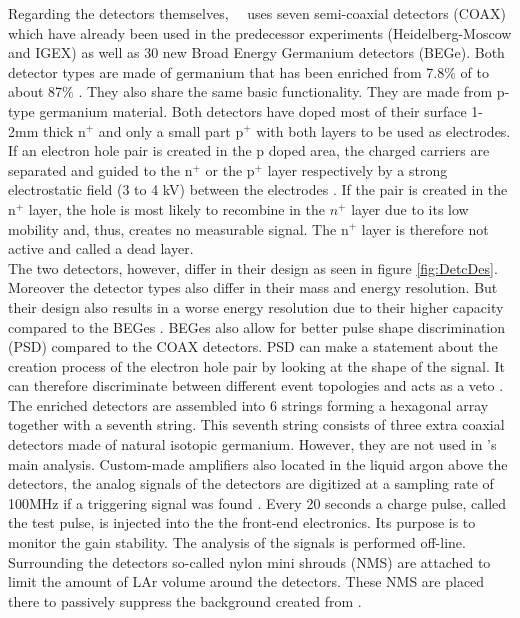 \documentclass[encoding=utf8,british]{tumphthesis}
\begin{document}
Regarding the detectors themselves, \gerda\ \PII\ uses seven semi-coaxial detectors (COAX) which have already been used in the predecessor experiments (Heidelberg-Moscow and IGEX) as well as 30 new Broad Energy Germanium detectors (BEGe).
Both detector types are made of germanium that has been enriched from 7.8$\%$ of  to about 87$\%$ \cite{agostini_background_2017}.
They also share the same basic functionality.
They are made from p-type germanium material.
Both detectors have doped most of their surface 1-2mm thick n$^+$ and only a small part p$^+$ with both layers to be used as electrodes.
If an electron hole pair is created in the p doped area, the charged carriers are separated and guided to the n$^+$ or the p$^+$ layer respectively by a strong electrostatic field (3 to 4 kV) between the electrodes \cite{spieler_semiconductor_2005}.
If the pair is created in the n$^+$ layer, the hole is most likely to recombine in the $n^+$ layer due to its low mobility and, thus, creates no measurable signal.
The n$^+$ layer is therefore not active and called a dead layer.
\\

The two detectors, however, differ in their design as seen in figure \ref{fig:DetcDes}.
Moreover the detector types also differ in their mass and energy resolution.
But their design also results in a worse energy resolution due to their higher capacity compared to the BEGes \cite{agostini_production_2015}.
BEGes also allow for better pulse shape discrimination (PSD) compared to the COAX detectors.
PSD can make a statement about the creation process of the electron hole pair by looking at the shape of the signal.
It can therefore discriminate between different event topologies and acts as a veto \cite{agostini_pulse_2013}.
\\

The enriched detectors are assembled into 6 strings forming a hexagonal array together with a seventh string.
This seventh string consists of three extra coaxial detectors made of natural isotopic germanium.
However, they are not used in \gerda's main analysis.
Custom-made amplifiers also located in the liquid argon above the detectors, the analog signals of the detectors are digitized at a sampling rate of 100MHz if a triggering signal was found \cite{riboldi_cryogenic_2015}.
Every 20 seconds a charge pulse, called the test pulse, is injected into the the front-end electronics.
Its purpose is to monitor the gain stability.
The analysis of the signals is performed off-line.
Surrounding the detectors so-called nylon mini shrouds (NMS) are attached to limit the amount of LAr volume around the detectors.
These NMS are placed there to passively suppress the background created from \cite{agostini_background_2014}.
\end{document}
